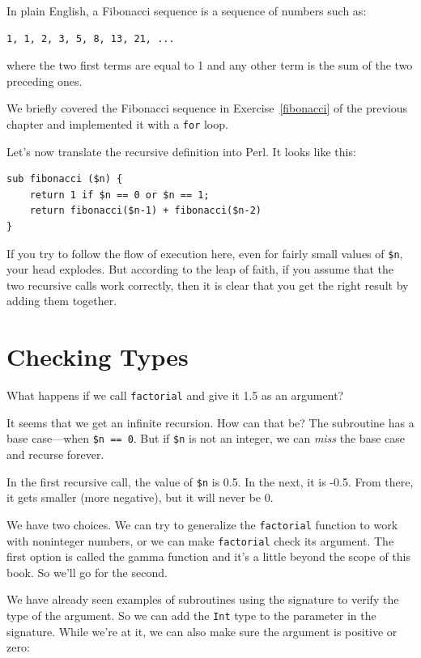 In plain English, a Fibonacci sequence is a sequence of numbers 
such as:
\begin{verbatim}
1, 1, 2, 3, 5, 8, 13, 21, ...
\end{verbatim}
where the two first terms are equal to 1 and any other term is the 
sum of the two preceding ones.

We briefly covered the Fibonacci sequence in Exercise~\ref{fibonacci} 
of the previous chapter and implemented it with a {\tt for} loop.

Let's now translate the recursive definition into Perl. It looks like this:

\begin{verbatim}
sub fibonacci ($n) {
    return 1 if $n == 0 or $n == 1;
    return fibonacci($n-1) + fibonacci($n-2)
}
\end{verbatim}
%
If you try to follow the flow of execution here, even for fairly
small values of \verb'$n', your head explodes.  But according to the
leap of faith, if you assume that the two recursive calls
work correctly, then it is clear that you get
the right result by adding them together.


\section{Checking Types}
\label{guardian}

What happens if we call {\tt factorial} and give it 1.5 as an argument?

It seems that we get an infinite recursion.  How can that be? 
The subroutine has a base case---when {\tt \$n == 0}.  But if {\tt \$n} 
is not an integer, we can {\em miss} the base case and recurse forever.

In the first recursive call, the value of {\tt \$n} is 0.5.
In the next, it is -0.5.  From there, it gets smaller
(more negative), but it will never be 0.

We have two choices.  We can try to generalize the {\tt factorial}
function to work with noninteger numbers, or we can make 
{\tt factorial} check its argument.  The first option is 
called the gamma function and it's a little beyond the scope 
of this book.  So we'll go for the second.

We have already seen examples of subroutines using the signature 
to verify the type of the argument. So we can add the {\tt Int} 
type to the parameter in the signature. While we're at it, 
we can also make sure the argument is positive or zero:

